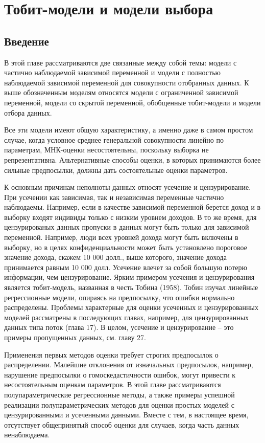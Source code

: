 
\chapter {Тобит-модели и модели выбора}

\section{Введение}

В этой главе рассматриваются две связанные между собой темы: модели с частично наблюдаемой зависимой переменной и модели с полностью наблюдаемой зависимой переменной для совокупности отобранных данных. К выше обозначенным моделям относятся модели с ограниченной зависимой переменной, модели со скрытой переменной, обобщенные тобит-модели и модели отбора данных. 

Все эти модели имеют общую характеристику, а именно даже в самом простом случае, когда условное среднее генеральной совокупности линейно по параметрам, МНК-оценки несостоятельны, поскольку выборка не репрезентативна. Альтернативные способы оценки, в которых принимаются более сильные предпосылки, должны дать состоятельные оценки параметров.

К основным причинам неполноты данных относят усечение и цензурирование. При усечении как зависимая, так и независимая переменные частично наблюдаемы. Например, если в качестве зависимой переменной берется доход и в выборку входят индивиды только с низким уровнем доходов. В то же время, для цензурированых данных пропуски в данных могут быть только для зависимой переменной. Например, люди всех уровней дохода могут быть включены в выборку, но в целях конфиденциальности может быть установлено пороговое значение дохода, скажем 10 000 долл., выше которого, значение дохода принимается равным 10 000 долл. Усечение влечет за собой большую потерю информации, чем цензурирование. Ярким примером усечения и цензурирования является тобит-модель, названная в честь Тобина (1958). Тобин изучал линейные регрессионные модели, опираясь на предпосылку, что ошибки нормально распределены. Проблемы характерные для оценки усеченных и цензурированных моделей рассматрены в последующих главах, например, для цензурированных данных типа поток (глава 17). В целом, усечение и цензурирование -- это примеры пропущенных данных, см. главу 27.

Применения первых методов оценки требует строгих предпосылок о распределении. Малейшие отклонения от изначальных предпосылок, например, нарушение предпосылки о гомоскедастичности ошибок, могут привести к несостоятельным оценкам параметров. В этой главе рассматриваются полупараметрические регрессионные методы, а также примеры успешной реализации полупараметрических методов для оценки простых моделей с цензурированными и усеченными данными. Вместе с тем, в настоящее время, отсутствует общепринятый способ оценки для случаев, когда часть данных ненаблюдаема.


